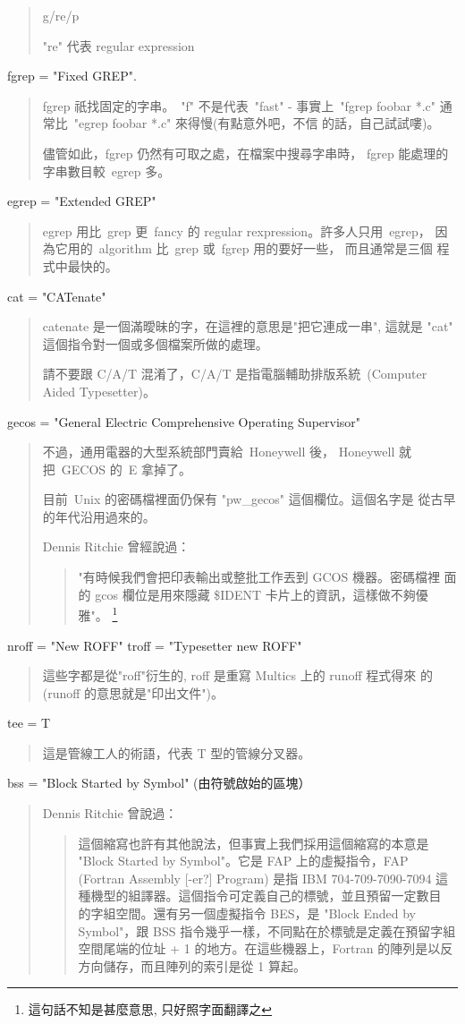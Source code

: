 \documentclass{article}
\begin{document}
\begin{CJK*}{Bg5}{ming}
\begin{quote}
	g/re/p

	"re" 代表 regular expression
    \end{quote}
    fgrep = "Fixed GREP".
    \begin{quote}
	fgrep 祇找固定的字串。~"f" 不是代表~"fast" - 事實上~"fgrep 
	foobar *.c" 通常比~"egrep foobar *.c" 來得慢(有點意外吧，不信
	的話，自己試試嘍)。

	儘管如此，fgrep 仍然有可取之處，在檔案中搜尋字串時，
	fgrep 能處理的字串數目較~egrep 多。
    \end{quote}
    egrep = "Extended GREP"
    \begin{quote}
	egrep 用比~grep 更~fancy 的 regular rexpression。許多人只用~egrep，
        因為它用的~algorithm 比~grep 或~fgrep 用的要好一些， 而且通常是三個
        程式中最快的。
    \end{quote}
    cat = "CATenate"
    \begin{quote}
	catenate 是一個滿曖昧的字，在這裡的意思是"把它連成一串", 這就是
	"cat" 這個指令對一個或多個檔案所做的處理。

	請不要跟 C/A/T 混淆了，C/A/T 是指電腦輔助排版系統~(Computer 
	Aided Typesetter)。
    \end{quote}
    gecos = "General Electric Comprehensive Operating Supervisor"
    \begin{quote}
	不過，通用電器的大型系統部門賣給~Honeywell 後，
        Honeywell 就把~GECOS 的~E 拿掉了。

	目前~Unix 的密碼檔裡面仍保有 "pw\_gecos" 這個欄位。這個名字是
	從古早的年代沿用過來的。

	Dennis Ritchie 曾經說過：
        \begin{quotation}

	    "有時候我們會把印表輸出或整批工作丟到 GCOS 機器。密碼檔裡
            面的 gcos 欄位是用來隱藏 \$IDENT 卡片上的資訊，這樣做不夠優雅"。
            \footnote{這句話不知是甚麼意思, 只好照字面翻譯之}
        \end{quotation}
    \end{quote}
    nroff = "New ROFF" \newline
    troff = "Typesetter new ROFF"
    \begin{quote}
	這些字都是從"roff"衍生的, roff 是重寫 Multics 上的 runoff 程式得來
	的 (runoff 的意思就是"印出文件")。
    \end{quote}
    tee = T
    \begin{quote}
	這是管線工人的術語，代表 T 型的管線分叉器。
    \end{quote}
    bss = "Block Started by Symbol" (由符號啟始的區塊）
    \begin{quote}
	Dennis  Ritchie 曾說過：
    	\begin{quotation}
	    這個縮寫也許有其他說法，但事實上我們採用這個縮寫的本意是 
            "Block Started by Symbol"。它是 FAP 上的虛擬指令，FAP 
            (Fortran Assembly [-er?] Program) 是指 IBM 704-709-7090-7094 
	    這種機型的組譯器。這個指令可定義自己的標號，並且預留一定數目
	    的字組空間。還有另一個虛擬指令 BES，是 "Block Ended by 
   	    Symbol"，跟 BSS 指令幾乎一樣，不同點在於標號是定義在預留字組
	    空間尾端的位址 + 1 的地方。在這些機器上，Fortran 的陣列是以反
	    方向儲存，而且陣列的索引是從 1 算起。


\end{quotation}
\end{quote}
\end{CJK*}
\end{document}

